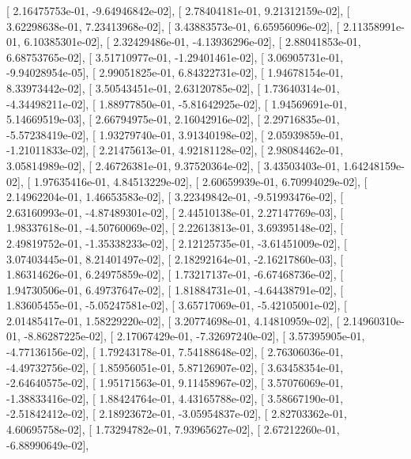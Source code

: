 \documentclass{article}
\begin{document}
       [  2.16475753e-01,  -9.64946842e-02],
       [  2.78404181e-01,   9.21312159e-02],
       [  3.62298638e-01,   7.23413968e-02],
       [  3.43883573e-01,   6.65956096e-02],
       [  2.11358991e-01,   6.10385301e-02],
       [  2.32429486e-01,  -4.13936296e-02],
       [  2.88041853e-01,   6.68753765e-02],
       [  3.51710977e-01,  -1.29401461e-02],
       [  3.06905731e-01,  -9.94028954e-05],
       [  2.99051825e-01,   6.84322731e-02],
       [  1.94678154e-01,   8.33973442e-02],
       [  3.50543451e-01,   2.63120785e-02],
       [  1.73640314e-01,  -4.34498211e-02],
       [  1.88977850e-01,  -5.81642925e-02],
       [  1.94569691e-01,   5.14669519e-03],
       [  2.66794975e-01,   2.16042916e-02],
       [  2.29716835e-01,  -5.57238419e-02],
       [  1.93279740e-01,   3.91340198e-02],
       [  2.05939859e-01,  -1.21011833e-02],
       [  2.21475613e-01,   4.92181128e-02],
       [  2.98084462e-01,   3.05814989e-02],
       [  2.46726381e-01,   9.37520364e-02],
       [  3.43503403e-01,   1.64248159e-02],
       [  1.97635416e-01,   4.84513229e-02],
       [  2.60659939e-01,   6.70994029e-02],
       [  2.14962204e-01,   1.46653583e-02],
       [  3.22349842e-01,  -9.51993476e-02],
       [  2.63160993e-01,  -4.87489301e-02],
       [  2.44510138e-01,   2.27147769e-03],
       [  1.98337618e-01,  -4.50760069e-02],
       [  2.22613813e-01,   3.69395148e-02],
       [  2.49819752e-01,  -1.35338233e-02],
       [  2.12125735e-01,  -3.61451009e-02],
       [  3.07403445e-01,   8.21401497e-02],
       [  2.18292164e-01,  -2.16217860e-03],
       [  1.86314626e-01,   6.24975859e-02],
       [  1.73217137e-01,  -6.67468736e-02],
       [  1.94730506e-01,   6.49737647e-02],
       [  1.81884731e-01,  -4.64438791e-02],
       [  1.83605455e-01,  -5.05247581e-02],
       [  3.65717069e-01,  -5.42105001e-02],
       [  2.01485417e-01,   1.58229220e-02],
       [  3.20774698e-01,   4.14810959e-02],
       [  2.14960310e-01,  -8.86287225e-02],
       [  2.17067429e-01,  -7.32697240e-02],
       [  3.57395905e-01,  -4.77136156e-02],
       [  1.79243178e-01,   7.54188648e-02],
       [  2.76306036e-01,  -4.49732756e-02],
       [  1.85956051e-01,   5.87126907e-02],
       [  3.63458354e-01,  -2.64640575e-02],
       [  1.95171563e-01,   9.11458967e-02],
       [  3.57076069e-01,  -1.38833416e-02],
       [  1.88424764e-01,   4.43165788e-02],
       [  3.58667190e-01,  -2.51842412e-02],
       [  2.18923672e-01,  -3.05954837e-02],
       [  2.82703362e-01,   4.60695758e-02],
       [  1.73294782e-01,   7.93965627e-02],
       [  2.67212260e-01,  -6.88990649e-02],
\end{document}
